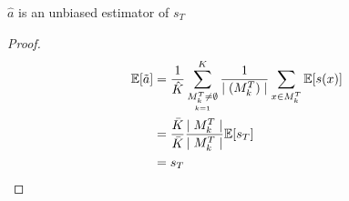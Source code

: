 \begin{theorem}\label{theorem:unbiased}
$\hat{a}$ is an unbiased estimator of $s_T$
\end{theorem}



\begin{proof}
\begin{align*}
    \mathbb{E}[\Tilde{a}] &= \frac{1}{\hat{K}} \sum_{\underset{k = 1}{M_k^T \neq \emptyset}}^{K} \frac{1}{\mid (M_k^T) \mid} \sum_{x \in M_k^T} \mathbb{E}[s(x)]\\
    &= \frac{\bar{K}}{\bar{K}} \frac{\mid M_k^T \mid}{\mid M_k^T \mid} \mathbb{E}[s_T]\\
    &= s_T
\end{align*}
\end{proof}